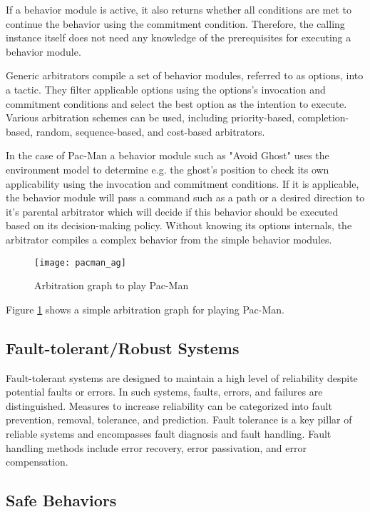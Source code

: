 If a behavior module is active, it also returns whether all conditions are met to continue the behavior using the commitment condition.
Therefore, the calling instance itself does not need any knowledge of the prerequisites for executing a behavior module.

Generic arbitrators compile a set of behavior modules, referred to as options, into a tactic.
They filter applicable options using the options's invocation and commitment conditions and select the best option as the intention to execute.
Various arbitration schemes can be used, including priority-based, completion-based, random, sequence-based, and cost-based arbitrators.

In the case of Pac-Man a behavior module such as "Avoid Ghost" uses the environment model to determine e.g. the ghost's position to check its own applicability using the invocation and commitment conditions.
If it is applicable, the behavior module will pass a command such as a path or a desired direction to it's parental arbitrator which will decide if this behavior should be executed based on its decision-making policy.
Without knowing its options internals, the arbitrator compiles a complex behavior from the simple behavior modules.

\begin{figure}
  \centering
  \texttt{[image: pacman\_ag]}

  \caption{Arbitration graph to play Pac-Man}%
  \label{fig:pacman_ag}
\end{figure}

Figure \ref{fig:pacman_ag} shows a simple arbitration graph for playing Pac-Man.

\subsection{Fault-tolerant/Robust Systems}

Fault-tolerant systems are designed to maintain a high level of reliability despite potential faults or errors. In such systems, faults, errors, and failures are distinguished. Measures to increase reliability can be categorized into fault prevention, removal, tolerance, and prediction. Fault tolerance is a key pillar of reliable systems and encompasses fault diagnosis and fault handling. Fault handling methods include error recovery, error passivation, and error compensation.

\subsection{Safe Behaviors}

